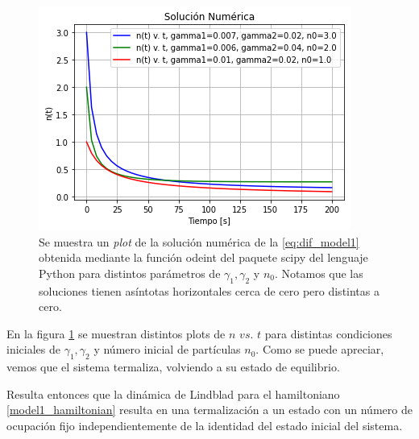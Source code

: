 \begin{figure}
    \centering
    \includegraphics[scale=1]{figs/tdd_modelito1_sol_eq_diff_modificada.png}
    \caption{Se muestra un \textit{plot} de la solución numérica de la \eqref{eq:dif_model1} obtenida mediante la función odeint del paquete scipy del lenguaje Python para distintos parámetros de $\gamma_1,\gamma_2$ y $n_0$. Notamos que las soluciones tienen asíntotas horizontales cerca de cero pero distintas a cero.}
    \label{fig:tdd_modelito1_sol_eq_diff_odeint_multiples}
\end{figure}

En la figura \ref{fig:tdd_modelito1_sol_eq_diff_odeint_multiples} se muestran distintos plots de $n$ $vs$. $t$ para distintas condiciones iniciales de $\gamma_1, \gamma_2$ y número inicial de partículas $n_0$. Como se puede apreciar, vemos que el sistema termaliza, volviendo a su estado de equilibrio.

Resulta entonces que la dinámica de Lindblad para el hamiltoniano \eqref{model1_hamiltonian} resulta en una termalización a un estado con un número de ocupación fijo independientemente de la identidad del estado inicial del sistema.


